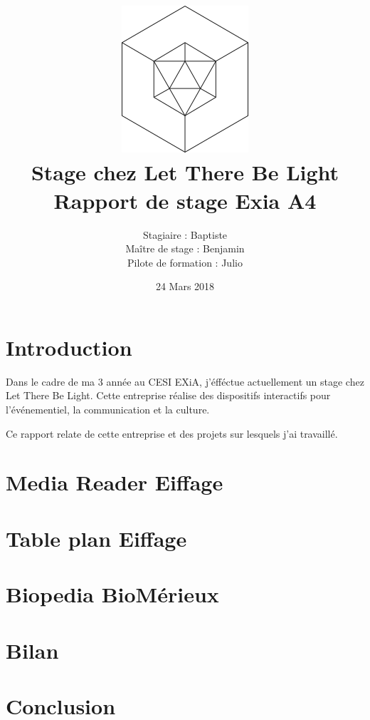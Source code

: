 \documentclass{article}
\title{\includegraphics{img/logo.png}\vspace{2cm}\\
    Stage chez Let There Be Light \\
    \large Rapport de stage Exia A4}
\date{24 Mars 2018}
\author{Stagiaire : Baptiste \bsc{Saclier} \\
    Maître de stage : Benjamin \bsc{Petit}\\
    Pilote de formation : Julio \bsc{Santilario}}
\begin{document}
    \maketitle

    \clearpage

    \tableofcontents

    \section{Introduction}

    Dans le cadre de ma 3 année au CESI EXiA, j'éfféctue actuellement un stage chez Let There Be Light.
    Cette entreprise réalise des dispositifs interactifs pour l'événementiel, la communication et la culture.

    Ce rapport relate de cette entreprise et des projets sur lesquels j'ai travaillé.

    \clearpage

    

    

    

    

    \section{Media Reader Eiffage}

    \section{Table plan Eiffage}

    \section{Biopedia BioMérieux}

    \section{Bilan}

    \section{Conclusion}
\end{document}
